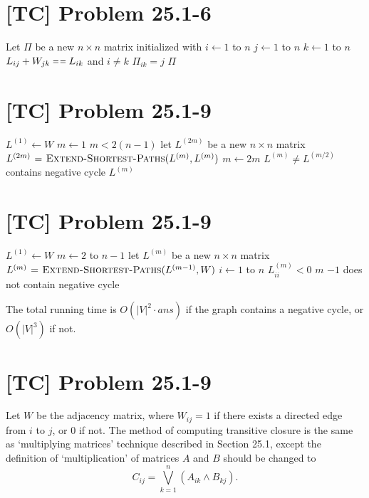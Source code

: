 \documentclass[a4paper,11pt,twocolumn]{article}
\newcommand{\NIL}{\const{nil}}
\begin{document}
  \section{[TC] Problem 25.1-6}
  \begin{codebox}
    \li Let $\Pi$ be a new $n \times n$ matrix initialized with \NIL
    \li \For $i \gets 1$ to $n$
    \li \Do  \For $j \gets 1$ to $n$
    \li      \Do  \For $k \gets 1$ to $n$
    \li           \Do  \If $L_{ij}+ W_{jk} \isequal L_{ik}$ and $i \neq k$
    \li                \Do $\Pi_{ik} = j$
                       \End
                  \End
             \End
        \End
    \li \Return $\Pi$
  \end{codebox}
  
  \section{[TC] Problem 25.1-9}
  \begin{codebox}
    \li $L^{(1)} \gets W$
    \li $m \gets 1$
    \li \While $m < 2(n-1)$
    \li \Do let $L^{(2m)}$ be a new $n \times n$ matrix
    \li     $L^{(2m)} \mathrel{\hspace{1pt}=\hspace{1pt}}  \textnormal{\scshape Extend-Shortest-Paths}(L^{(m)}, L^{(m)})$
    \li     $m \gets 2m$
        \End
    \li \If $L^{(m)} \neq L^{(m/2)}$
    \li \Do \Error contains negative cycle
        \End
    \li \Return $L^{(m)}$
  \end{codebox}
  
  \section{[TC] Problem 25.1-9}
  \begin{codebox}
    \li $L^{(1)} \gets W$
    \li \For $m \gets 2$ to $n-1$
    \li \Do  let $L^{(m)}$ be a new $n \times n$ matrix
    \li      $L^{(m)} \mathrel{\hspace{1pt}=\hspace{1pt}} \textnormal{\scshape Extend-Shortest-Paths}(L^{(m-1)}, W)$
    \li      \For $i \gets 1$ to $n$
    \li      \Do  \If $L^{(m)}_{ii} < 0$ 
    \li           \Do \Return $m$
                  \End
             \End
        \End
    \li \Return $-1$ \Comment does not contain negative cycle
  \end{codebox}
  The total running time is $O(|V|^2 \cdot ans)$ if the graph contains a negative cycle, or $O(|V|^3)$ if not.
  
  \section{[TC] Problem 25.1-9}
  Let $W$ be the adjacency matrix, where $W_{ij} = 1$ if there exists a directed edge from $i$ to $j$, or $0$ if not. The method of computing transitive closure is the same as `multiplying matrices' technique described in Section 25.1, except the definition of `multiplication' of matrices $A$ and $B$ should be changed to
  $$ C_{ij} = \bigvee_{k = 1}^n (A_{ik} \wedge B_{kj}) .$$
\end{document}
